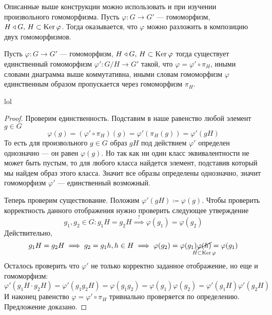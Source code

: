 \documentclass[../main.tex]{subfiles}
\begin{document}
  Описанные выше конструкции можно использовать и при изучении произвольного гомоморфизма. Пусть $\varphi\colon G \to G'$ --- гомоморфизм, $H \triangleleft G, \, H \subset \operatorname{Ker} \varphi$. Тогда оказывается, что $\varphi$ можно разложить в композицию двух гомоморфизмов.

\begin{figure}[ht]
    \centering
\end{figure}
\begin{theorem-non}
  \label{non:6.12}
  Пусть $\varphi\colon G \to G'$ --- гомоморфизм, $H \triangleleft G, \, H \subset \operatorname{Ker} \varphi$ тогда существует единственный гомоморфизм $\varphi'\colon G/H \to G'$ такой, что $\varphi = \varphi' \circ \pi_H$, иными словами диаграмма выше коммутативна, иными словам гомоморфизм $\varphi$ единственным образом пропускается через гомоморфизм $\pi_H$.
  \begin{editremark}
    lol
  \end{editremark}
\end{theorem-non}
\begin{proof}
  Проверим единственность. Подставим в наше равенство любой элемент $g \in G$
  \begin{equation*}
    \varphi(g) = (\varphi' \circ \pi_H)(g) = \varphi'(\pi_H(g)) = \varphi'(gH)
  \end{equation*}
  То есть для произвольного $g \in G$ образ $gH$ под действием $\varphi'$ определен однозначно --- он равен $\varphi(g)$. Но так как ни один класс эквивалентности не может быть пустым, то для любого класса найдется элемент, подставив который мы найдем образ этого класса. Значит все образы определены однозначно, значит гомоморфизм $\varphi'$ --- единственный возможный.

  Теперь проверим существование. Положим $\varphi'(gH) \coloneqq \varphi(g)$. Чтобы проверить корректность данного отображения нужно проверить следующее утверждение
  \begin{equation*}
    g_1, g_2 \in G \colon g_1H = g_2 H \overset{?}{\implies} \varphi(g_1) = \varphi(g_2)
  \end{equation*}
  Действительно,
  \begin{equation*}
    g_1H = g_2H \implies g_2 = g_1h, h \in H \implies \varphi(g_2) = \varphi(g_1)\underset{\mathclap{H \subset \Ker \varphi}}{\cancel{\varphi(h)}} = \varphi(g_1)
  \end{equation*}
  Осталось проверить что $\varphi'$ не только корректно заданное отображение, но еще и гомоморфизм:
  \begin{equation*}
    \varphi'(g_1H \cdot g_2H) = \varphi'(g_1g_2H) = \varphi(g_1g_2) = \varphi(g_1)\varphi(g_2) =
    \varphi'(g_1H)\varphi'(g_2H)
  \end{equation*}
  И наконец равенство $\varphi = \varphi' \circ \pi_H$ тривиально проверяется по определению. Предложение доказано.
\end{proof}
\end{document}
